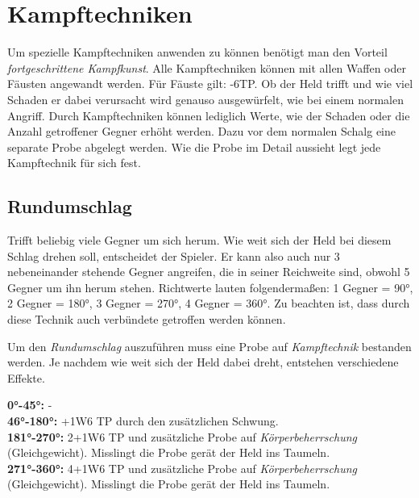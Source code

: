 \section{Kampftechniken}
Um spezielle Kampftechniken anwenden zu können benötigt man den Vorteil \textit{fortgeschrittene Kampfkunst}. Alle Kampftechniken können mit allen Waffen oder Fäusten angewandt werden. Für Fäuste gilt: -6TP. Ob der Held trifft und wie viel Schaden er dabei verursacht wird genauso ausgewürfelt, wie bei einem normalen Angriff. Durch Kampftechniken können lediglich Werte, wie der Schaden oder die Anzahl getroffener Gegner erhöht werden. Dazu vor dem normalen Schalg eine separate Probe abgelegt werden. Wie die Probe im Detail aussieht legt jede Kampftechnik für sich fest.

\subsection{Rundumschlag}
Trifft beliebig viele Gegner um sich herum. Wie weit sich der Held bei diesem Schlag drehen soll, entscheidet der Spieler. Er kann also auch nur 3 nebeneinander stehende Gegner angreifen, die in seiner Reichweite sind, obwohl 5 Gegner um ihn herum stehen. Richtwerte lauten folgendermaßen: 1 Gegner = 90°, 2 Gegner = 180°, 3 Gegner = 270°, 4 Gegner = 360°. Zu beachten ist, dass durch diese Technik auch verbündete getroffen werden können.

Um den \textit{Rundumschlag} auszuführen muss eine Probe auf \textit{Kampftechnik} bestanden werden. Je nachdem wie weit sich der Held dabei dreht, entstehen verschiedene Effekte.

\textbf{0°-45°:} - \\
\textbf{46°-180°:} +1W6 TP durch den zusätzlichen Schwung. \\
\textbf{181°-270°:} 2+1W6 TP und zusätzliche Probe auf \textit{Körperbeherrschung} (Gleichgewicht). Misslingt die Probe gerät der Held ins Taumeln. \\
\textbf{271°-360°:} 4+1W6 TP und zusätzliche Probe auf \textit{Körperbeherrschung} (Gleichgewicht). Misslingt die Probe gerät der Held ins Taumeln. \\
